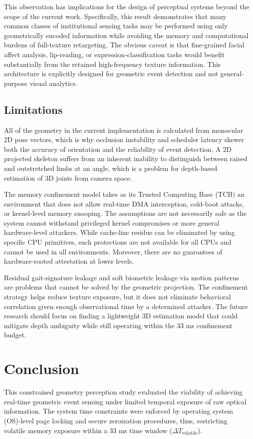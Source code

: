 \documentclass[conference]{IEEEtran}
\begin{document}
This observation has implications for the design of perceptual systems beyond the scope of the current work. Specifically, this result demonstrates that many common classes of institutional sensing tasks may be performed using only geometrically encoded information while avoiding the memory and computational burdens of full-texture retargeting. The obvious caveat is that fine-grained facial affect analysis, lip-reading, or expression-classification tasks would benefit substantially from the retained high-frequency texture information. This architecture is explicitly designed for geometric event detection and not general-purpose visual analytics.

\subsection{Limitations}
All of the geometry in the current implementation is calculated from monocular 2D pose vectors, which is why occlusion instability and scheduler latency skewer both the accuracy of orientation and the reliability of event detection. A 2D projected skeleton suffers from an inherent inability to distinguish between raised and outstretched limbs at an angle, which is a problem for depth-based estimation of 3D joints from camera space.

The memory confinement model takes as its Trusted Computing Base (TCB) an environment that does not allow real-time DMA interception, cold-boot attacks, or kernel-level memory snooping. The assumptions are not necessarily safe as the system cannot withstand privileged kernel compromises or more general hardware-level attackers. While cache-line residue can be eliminated by using specific CPU primitives, such protections are not available for all CPUs and cannot be used in all environments. Moreover, there are no guarantees of hardware-rooted attestation at lower levels.

Residual gait-signature leakage and soft biometric leakage via motion patterns are problems that cannot be solved by the geometric projection. The confinement strategy helps reduce texture exposure, but it does not eliminate behavioral correlation given enough observational time by a determined attacker. The future research should focus on finding a lightweight 3D estimation model that could mitigate depth ambiguity while still operating within the 33 ms confinement budget.

\section{Conclusion}
This constrained geometry perception study evaluated the viability of achieving real-time geometric event sensing under limited temporal exposure of raw optical information. The system time constraints were enforced by operating system (OS)-level page locking and secure zeroization procedures, thus, restricting volatile memory exposure within a 33 ms time window ($\Delta T_{\text{volatile}}$).
\end{document}
